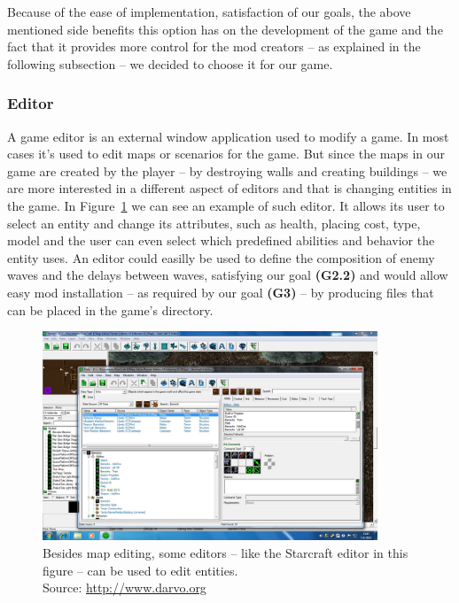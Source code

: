 Because of the ease of implementation, satisfaction of our goals, the above mentioned side benefits this option has on the
development of the game and the fact that it provides more control for the mod creators -- as explained in the following subsection --
we decided to choose it for our game.

\subsubsection{Editor}

A game editor is an external window application used to modify a game. In most cases it's used to edit maps or scenarios for the game.
But since the maps in our game are created by the player -- by destroying walls and creating buildings -- we are more interested in a
different aspect of editors and that is changing entities in the game. In Figure~\ref{sc-editor} we can see an example of such editor.
It allows its user to select an entity and change its attributes, such as health, placing cost, type, model and the user can even 
select which predefined abilities and behavior the entity uses. An editor could easilly be used to define the composition of enemy
waves and the delays between waves, satisfying our goal \textbf{(G2.2)} and would allow easy mod installation -- as required by our goal
\textbf{(G3)} -- by producing files that can be placed in the game's directory.

\begin{figure}[h]
    \centering
    \includegraphics[width=10cm]{../img/sc_editor.jpg}
    \caption{Besides map editing, some editors -- like the Starcraft editor in this figure -- can be used to edit entities.
             \\Source: \href{http://www.darvo.org/images/Tutorials\%20Starcraft\%202/Adding\%20Units\%20to\%20a\%20Building\%20part\%201.jpg}
             {http://www.darvo.org}}
    \label{sc-editor}
\end{figure}

